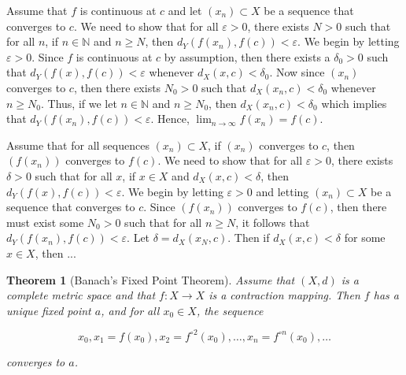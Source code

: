 \documentclass{article}
\makeatletter
\newtheorem{theorem}{Theorem}[section]
\theoremstyle{definition}
\theoremstyle{remark}
\let\oldproofname=\proofname
\renewcommand{\proofname}{\bf{\textit{\oldproofname}}}
\theoremstyle{definition}
\renewenvironment{proof}[1][\proofname]{\par
  \pushQED{\qed}%
  \normalfont \topsep6\p@\@plus6\p@\relax
  \list{}{\leftmargin=0mm
          \rightmargin=0mm
          \settowidth{\itemindent}{\itshape#1}%
          \labelwidth=\itemindent
          \parsep=0pt \listparindent=0mm%
  }
  \item[\hskip\labelsep
        \itshape
    #1\@addpunct{.}]\ignorespaces
}{%
  \popQED\endlist\@endpefalse
}
\makeatother
\begin{document}
    \begin{proof}
        Assume that $f$ is continuous at $c$ and let $(x_n)\subset X$ be a sequence that converges to $c$. We need to show that for all $\varepsilon>0$, there exists $N> 0$ such that for all $n$, if $n\in\mathbb{N}$ and $n\geq N$, then $d_Y(f(x_n),f(c))<\varepsilon$. We begin by letting $\varepsilon>0$. Since $f$ is continuous at $c$ by assumption, then there exists a $\delta_0>0$ such that $d_Y(f(x),f(c))<\varepsilon$ whenever $d_X(x,c)<\delta_0$. Now since $(x_n)$ converges to $c$, then there exists $N_0>0$ such that $d_X(x_n,c)<\delta_0$ whenever $n\geq N_0$. Thus, if we let $n\in\mathbb{N}$ and $n\geq N_0$, then $d_X(x_n,c)<\delta_0$ which implies that $d_Y(f(x_n),f(c))<\varepsilon$. Hence, $\lim_{n\rightarrow\infty}f(x_n)=f(c)$.\par\hspace{4mm} Assume that for all sequences $(x_n)\subset X$, if $(x_n)$ converges to $c$, then $(f(x_n))$ converges to $f(c)$. We need to show that for all $\varepsilon>0$, there exists $\delta>0$ such that for all $x$, if $x\in X$ and $d_X(x,c)<\delta$, then $d_Y(f(x),f(c))<\varepsilon$. We begin by letting $\varepsilon>0$ and letting $(x_n)\subset X$ be a sequence that converges to $c$. Since $(f(x_n))$ converges to $f(c)$, then there must exist some $N_0>0$ such that for all $n\geq N$, it follows that $d_Y(f(x_n),f(c))<\varepsilon$. Let $\delta=d_X(x_N,c)$. Then if $d_X(x,c)<\delta$ for some $x\in X$, then ...
    \end{proof}
    
    \begin{theorem}[Banach's Fixed Point Theorem]\label{thm:1.1}
        Assume that $(X,d)$ is a complete metric space and that $f\colon X\rightarrow X$ is a contraction mapping. Then $f$ has a unique fixed point $a$, and for all $x_0\in X$, the sequence 
        
        \begin{equation*}
            x_0, x_1=f(x_0), x_2=f^{\circ 2}(x_0), \dots, x_n=f^{\circ n}(x_0),\dots
        \end{equation*}
        
        \noindent converges to $a$.
    \end{theorem}
    
\end{document}
